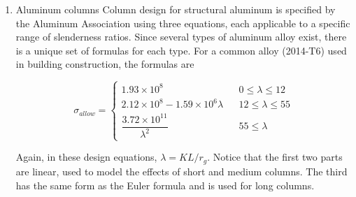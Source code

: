 \documentclass[a4paper,openany,nobib]{tufte-book}
\begin{document}
{{\begin{enumerate}
Refering to the catalog for W-shape steel, the proper section is W360
\(\times\) 39.

Now, using the AISC equation, there is no analytical relationship for us
to solve for the required \(I\) or \(r_g\). Instead, we must use the
equation to calculate allowable load on each cross section. The
generated allowable load data table is

 L2.5cm C2cm C2cm C2cm C2cm C2cm W section \& \(r_g\) (mm) \& \(A\) (mm\(^2\)) \&
Slenderness Ratio \& \(\sigma_{allow}\) (MPa) \& \(P_{allow}\) (kN)\\
W360 \(\times\) 39 \& 27.5 \& 4960 \& 218 \& -63 \& -314\\
W360 \(\times\) 45 \& 37.8 \& 5710 \& 159 \& 32 \& 183\\
W200 \(\times\) 36 \& 40.9 \& 4570 \& 147 \& 46 \& 211\\
W150 \(\times\) 22 \& 36.8 \& 2860 \& 163 \& 26.6 \& 76\\

At first, we find that our original choice W360 \(\times\) 39 does not
have the proper slenderness ratio (218 was higher than 200). So we pick
a next larger one, W360 \(\times\) 45, but find that it can support much
larger load than required. Subsequently, by process of elimination, we
find the lightest section that still support sufficient compressive load
is the W150 \(\times\) 22.

\item Aluminum columns
\label{aluminum-columns}
Column design for structural aluminum is specified by the Aluminum
Association using three equations, each applicable to a specific range
of slenderness ratios. Since several types of aluminum alloy exist,
there is a unique set of formulas for each type. For a common alloy
(2014-T6) used in building construction, the formulas are

$$\sigma_{allow} = \left\{
    \begin{array}{lcc}
      1.93 \times 10^8 &&  0 \leqslant \lambda \leqslant 12 \\[20pt] 
      2.12 \times 10^8 - 1.59 \times 10^6 \lambda && 12 \leqslant \lambda \leqslant 55 \\[20pt]
      \dfrac{3.72 \times 10^{11}}{ \lambda^2 } && 55 \leqslant \lambda 
    \end{array} \right.$$

Again, in these design equations, \(\lambda = KL/r_g\). Notice that the
first two parts are linear, used to model the effects of short and
medium columns. The third has the same form as the Euler formula and is
used for long columns.



\end{enumerate}}}
\end{document}
